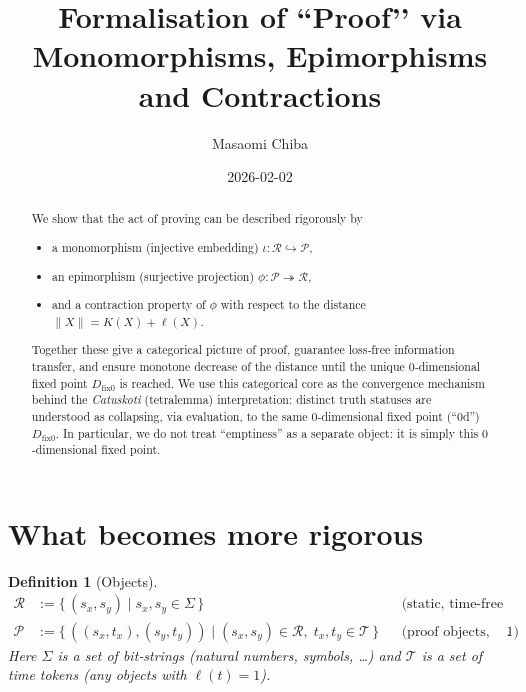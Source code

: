 \documentclass[12pt,a4paper]{article}
\newcommand{\dfix}{D_{\mathrm{fix}0}} %
\newcommand{\Rep}{\mathcal{R}}           %
\newcommand{\Prf}{\mathcal{P}}           %
\newcommand{\Tset}{\mathcal{T}}          %
\newtheorem{definition}{Definition}[section]
\begin{document}
\title{Formalisation of ``Proof’’ via Monomorphisms, Epimorphisms and
Contractions}
\author{Masaomi Chiba}
\date{2026-02-02}
\maketitle

\begin{abstract}
We show that the act of proving can be described rigorously by
\begin{itemize}[nosep]
  \item a monomorphism (injective embedding) $\iota\colon\Rep\hookrightarrow\Prf$,
  \item an epimorphism (surjective projection) $\phi\colon\Prf\twoheadrightarrow\Rep$,
  \item and a contraction property of $\phi$ with respect to the distance
        $\|X\|=K(X)+\ell(X)$.
\end{itemize}
Together these give a categorical picture of proof, guarantee loss‑free
information transfer, and ensure monotone decrease of the distance until the
unique $0$‑dimensional fixed point $\dfix$ is reached.
We use this categorical core as the convergence mechanism behind the
\emph{Catuskoti} (tetralemma) interpretation: distinct truth statuses are
understood as collapsing, via evaluation, to the same $0$‑dimensional fixed
point (``0d'') $\dfix$.
In particular, we do not treat ``emptiness'' as a separate object: it is
simply this $0$‑dimensional fixed point.
\end{abstract}

\section{What becomes more rigorous}

\begin{definition}[Objects]
$$
\begin{aligned}
\Rep &:= \{\, (s_x,s_y)\mid s_x,s_y\in\Sigma \,\}
      &&\text{(static, time‑free information)}\\[2mm]
\Prf &:= \{\, ((s_x,t_x),(s_y,t_y))
          \mid (s_x,s_y)\in\Rep,\;t_x,t_y\in\Tset \,\}
      &&\text{(proof objects, time‑axis of length $1$)} .
\end{aligned}
$$
Here $\Sigma$ is a set of bit‑strings (natural numbers, symbols, …) and
$\Tset$ is a set of \emph{time tokens} (any objects with $\ell(t)=1$).
\end{definition}
\end{document}
